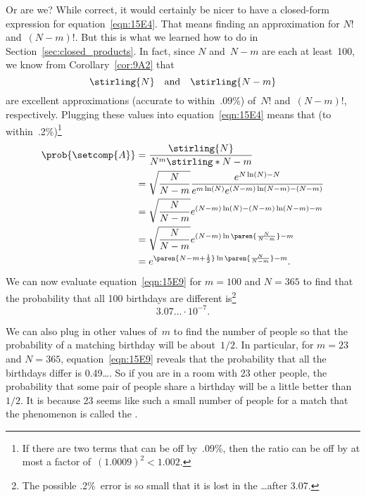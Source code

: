 \begin{editingnotes}
Or are we?  While correct, it would certainly be nicer to have a
closed-form expression for equation~\eqref{eqn:15E4}.  That means
finding an approximation for $N!$ and~$(N - m)!$.  But this is what we
learned how to do in Section~\ref{sec:closed_products}.  In fact, since
$N$ and~$N - m$ are each at least~100, we know from
Corollary~\ref{cor:9A2} that
\begin{equation*}
    \stirling{N} \quad \text{and} \quad \stirling{N - m}
\end{equation*}
are excellent approximations (accurate to within~.09\%) of~$N!$ and~$(N
- m)!$, respectively.  Plugging these values into
equation~\eqref{eqn:15E4} means that (to within~.2\%)\footnote{If there
are two terms that can be off by~.09\%, then the ratio can be off by
at most a factor of~$(1.0009)^2 < 1.002$.}
\begin{align}
\prob{\setcomp{A}}
    &= \frac{ \stirling{N} }{ N^m \stirling*{N - m} } \notag\\
    &= \sqrt{\frac{N}{N - m}}
             \frac{ e^{N \ln(N) - N} }
                  { e^{m \ln(N)} e^{(N - m) \ln(N - m) - (N - m) } }
                  \notag\\
    &= \sqrt{\frac{N}{N - m}}
         e^{ (N - m)\ln(N) - (N - m) \ln(N - m) - m } \notag\\
    &= \sqrt{\frac{N}{N - m}}
         e^{ (N - m)\ln\paren{\frac{N}{N - m}} - m } \notag\\
    &= e^{ \paren{N - m + \frac{1}{2}}\ln\paren{\frac{N}{N - m}} - m }.
        \label{eqn:15E9}
\end{align}
We can now evaluate equation~\eqref{eqn:15E9} for $m = 100$ and $N =
365$ to find that the probability that all 100 birthdays are different
is\footnote{The possible .2\%~error is so small that
  it is lost in the \dots after 3.07.}
\begin{equation*}
    3.07\ldots \cdot 10^{-7}.
\end{equation*}

We can also plug in other values of~$m$ to find the number of people
so that the probability of a matching birthday will be about~$1/2$.
In particular, for $m = 23$ and $N = 365$, equation~\eqref{eqn:15E9}
reveals that the probability that all the birthdays differ is
0.49\dots.  So if you are in a room with 23 other people, the
probability that some pair of people share a birthday will be a little
better than~$1/2$.  It is because 23 seems like such a small number of
people for a match that the phenomenon is called the .






\end{editingnotes}

